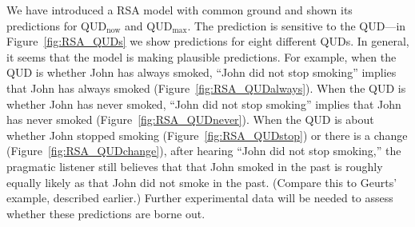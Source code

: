 We have introduced a RSA model with common ground and shown its
 predictions for QUD$_\textrm{now}$ and QUD$_\textrm{max}$.
The prediction is sensitive to the QUD---in Figure~\ref{fig:RSA_QUDs} we show predictions for eight different QUDs.
In general, it seems that the model is making plausible predictions. 
For example, when the QUD is whether John has always smoked, ``John did not stop smoking'' implies that John has always smoked (Figure~\ref{fig:RSA_QUDalways}). 
When the QUD is whether John has never smoked, ``John did not stop smoking'' implies that John has never smoked (Figure~\ref{fig:RSA_QUDnever}). 
When the QUD is about whether John stopped smoking (Figure~\ref{fig:RSA_QUDstop}) 
 or there is a change (Figure~\ref{fig:RSA_QUDchange}), after hearing
 ``John did not stop smoking,'' the pragmatic listener still believes that that John 
 smoked in the past is roughly equally likely as that John did not smoke in the past. 
 (Compare this to Geurts' example, described earlier.)
Further experimental data will be needed to assess whether these predictions are borne out.



